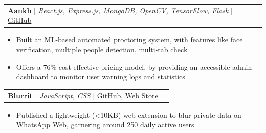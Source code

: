 \documentclass[letterpaper,10pt]{article}
\makeatletter
\newcommand{\resumeItem}[1]{
  \item\small{
    {#1 \vspace{-1pt}}
  }
}
\newcommand{\resumeProjectHeading}[2]{
    \item
    \begin{tabular*}{0.97\textwidth}{l@{\extracolsep{\fill}}r}
      #1 & \small\textit{#2} \\
    \end{tabular*}\vspace{-6pt}
}
\newcommand{\resumeItemListStart}{\begin{itemize}}
\newcommand{\resumeItemListEnd}{\end{itemize}\vspace{-5pt}}
\makeatother
\begin{document}

        \resumeProjectHeading { 
            \textbf{Aankh} 
            $|$ 
            \small
            {
                \emph{React.js, Express.js, MongoDB, OpenCV, TensorFlow, Flask}
            }
            $|$ 
            \href{https://github.com/tusharnankani/Aankh}{GitHub}        
        }
        {}
        \resumeItemListStart
            \resumeItem {
                Built an ML-based automated proctoring system, with features like face verification, multiple people detection, multi-tab check
            }
            \resumeItem {
                Offers a 76\% cost-effective pricing model, by providing an accessible admin dashboard to monitor user warning logs and statistics
            }
        \resumeItemListEnd

        \resumeProjectHeading { 
            \textbf{Blurrit} 
            $|$ 
            \small {   
                \emph{JavaScript, CSS}
            }
            $|$ 
            \href{https://github.com/tusharnankani/blurrit}{GitHub}, \href{https://chromewebstore.google.com/detail/blurrit/idknnkkejgomjlgbdpoblkfhhicekdjl}{Web Store}
        }
        {}
        \resumeItemListStart
            \resumeItem {
                 Published a lightweight (<10KB) web extension to blur private data on WhatsApp Web, garnering around 250 daily active users
            }
        \resumeItemListEnd
\end{document}

